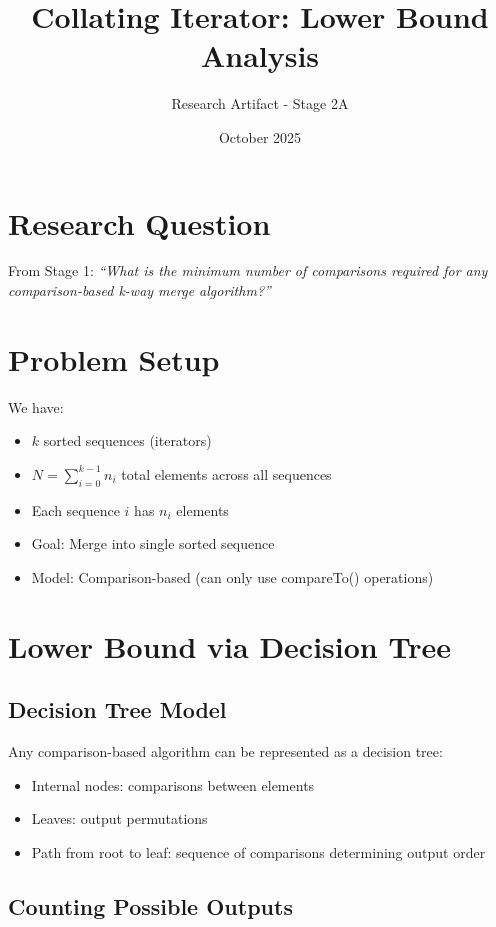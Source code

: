 \documentclass[11pt]{article}
\title{Collating Iterator: Lower Bound Analysis}
\author{Research Artifact - Stage 2A}
\date{October 2025}
\begin{document}
\maketitle

\section{Research Question}

From Stage 1: \textit{``What is the minimum number of comparisons required for any comparison-based k-way merge algorithm?''}

\section{Problem Setup}

We have:
\begin{itemize}
    \item $k$ sorted sequences (iterators)
    \item $N = \sum_{i=0}^{k-1} n_i$ total elements across all sequences
    \item Each sequence $i$ has $n_i$ elements
    \item Goal: Merge into single sorted sequence
    \item Model: Comparison-based (can only use compareTo() operations)
\end{itemize}

\section{Lower Bound via Decision Tree}

\subsection{Decision Tree Model}

Any comparison-based algorithm can be represented as a decision tree:
\begin{itemize}
    \item Internal nodes: comparisons between elements
    \item Leaves: output permutations
    \item Path from root to leaf: sequence of comparisons determining output order
\end{itemize}

\subsection{Counting Possible Outputs}
\end{document}
